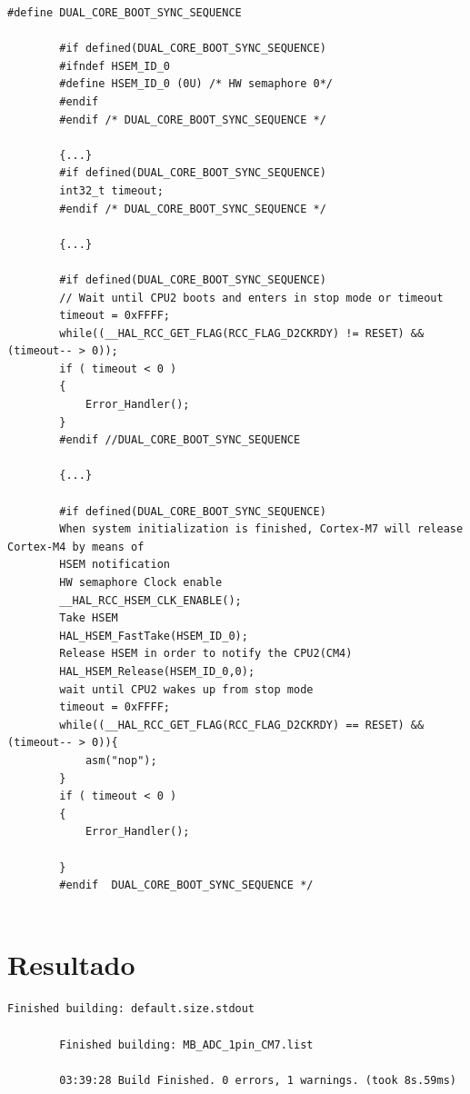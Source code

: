 \begin{minipage}{\textwidth}
	\begin{lstlisting}[caption={Borrado de la rutina de doble núcleo }, label={lst:borrado}]
		#define DUAL_CORE_BOOT_SYNC_SEQUENCE
		
		#if defined(DUAL_CORE_BOOT_SYNC_SEQUENCE)
		#ifndef HSEM_ID_0
		#define HSEM_ID_0 (0U) /* HW semaphore 0*/
		#endif
		#endif /* DUAL_CORE_BOOT_SYNC_SEQUENCE */
		
		{...}
		#if defined(DUAL_CORE_BOOT_SYNC_SEQUENCE)
		int32_t timeout;
		#endif /* DUAL_CORE_BOOT_SYNC_SEQUENCE */
		
		{...}
		
		#if defined(DUAL_CORE_BOOT_SYNC_SEQUENCE)
		// Wait until CPU2 boots and enters in stop mode or timeout
		timeout = 0xFFFF;
		while((__HAL_RCC_GET_FLAG(RCC_FLAG_D2CKRDY) != RESET) && (timeout-- > 0));
		if ( timeout < 0 )
		{
			Error_Handler();
		}
		#endif //DUAL_CORE_BOOT_SYNC_SEQUENCE
		
		{...}
		
		#if defined(DUAL_CORE_BOOT_SYNC_SEQUENCE)
		When system initialization is finished, Cortex-M7 will release Cortex-M4 by means of
		HSEM notification
		HW semaphore Clock enable
		__HAL_RCC_HSEM_CLK_ENABLE();
		Take HSEM
		HAL_HSEM_FastTake(HSEM_ID_0);
		Release HSEM in order to notify the CPU2(CM4)
		HAL_HSEM_Release(HSEM_ID_0,0);
		wait until CPU2 wakes up from stop mode
		timeout = 0xFFFF;
		while((__HAL_RCC_GET_FLAG(RCC_FLAG_D2CKRDY) == RESET) && (timeout-- > 0)){
			asm("nop");
		}
		if ( timeout < 0 )
		{
			Error_Handler();
			
		}
		#endif  DUAL_CORE_BOOT_SYNC_SEQUENCE */
		
	\end{lstlisting}
\end{minipage}	


\section{Resultado}
\begin{minipage}{\textwidth}
	\begin{lstlisting}[caption={Mensaje de que el código no tiene errores de compilación}, label={lst:lib56}]
		Finished building: default.size.stdout
		
		Finished building: MB_ADC_1pin_CM7.list
		
		03:39:28 Build Finished. 0 errors, 1 warnings. (took 8s.59ms)
	\end{lstlisting}
\end{minipage}	

